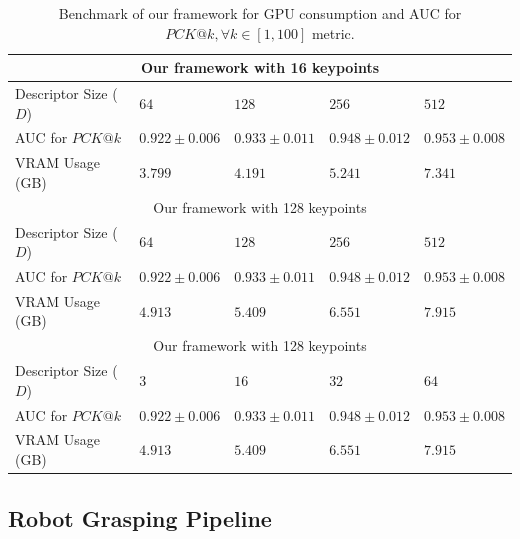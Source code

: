 \begin{table}[htb]
    \caption{Benchmark of our framework for GPU consumption and AUC for $PCK@k,  \forall k \in [1, 100]$ metric.}
    \label{table:framework_training_results}
    \centering
    \begin{tabular}{lllll}
        \toprule
        \multicolumn{5}{c}{Our framework with 16 keypoints}                                                   \\
        \midrule
        Descriptor Size ($D$) & $64 $             & $128 $            & $256 $            & $512$             \\
        AUC for $PCK@k$       & $0.922 \pm 0.006$ & $0.933 \pm 0.011$ & $0.948 \pm 0.012$ & $0.953 \pm 0.008$ \\
        VRAM Usage (GB)       & $3.799 $          & $4.191 $          & $5.241 $          & $7.341$           \\ \hline
        \multicolumn{5}{c}{Our framework with 128 keypoints}                                                  \\
        \midrule
        Descriptor Size ($D$) & $64 $             & $128 $            & $256 $            & $512$             \\
        AUC for $PCK@k$       & $0.922 \pm 0.006$ & $0.933 \pm 0.011$ & $0.948 \pm 0.012$ & $0.953 \pm 0.008$ \\
        VRAM Usage (GB)       & $4.913 $          & $5.409 $          & $6.551$           & $7.915$           \\ \hline
        \multicolumn{5}{c}{Our framework with 128 keypoints}                                                  \\
        \midrule
        Descriptor Size ($D$) & $3 $              & $16 $             & $32 $             & $64$              \\
        AUC for $PCK@k$       & $0.922 \pm 0.006$ & $0.933 \pm 0.011$ & $0.948 \pm 0.012$ & $0.953 \pm 0.008$ \\
        VRAM Usage (GB)       & $4.913 $          & $5.409 $          & $6.551$           & $7.915$           \\
        \bottomrule
    \end{tabular}
\end{table}


\subsection{Robot Grasping Pipeline}

